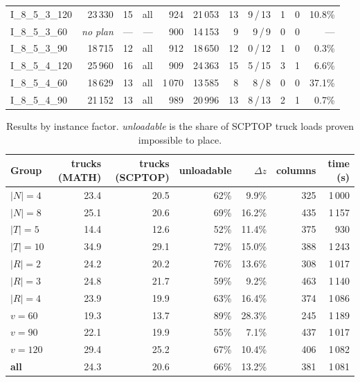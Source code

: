\begin{table}[!htbp]
{\begin{tabular}{lrrrrrrrrrr}
I\_8\_5\_3\_120 & 23\,330 & 15 & all & 924 & 21\,053 & 13 & 9\,/\,13 & 1 & 0 & 10.8\% \\
I\_8\_5\_3\_60 & \emph{no plan} & --- & --- & 900 & 14\,153 & 9 & 9\,/\,9 & 0 & 0 & --- \\
I\_8\_5\_3\_90 & 18\,715 & 12 & all & 912 & 18\,650 & 12 & 0\,/\,12 & 1 & 0 & 0.3\% \\
I\_8\_5\_4\_120 & 25\,960 & 16 & all & 909 & 24\,363 & 15 & 5\,/\,15 & 3 & 1 & 6.6\% \\
I\_8\_5\_4\_60 & 18\,629 & 13 & all & 1\,070 & 13\,585 & 8 & 8\,/\,8 & 0 & 0 & 37.1\% \\
I\_8\_5\_4\_90 & 21\,152 & 13 & all & 989 & 20\,996 & 13 & 8\,/\,13 & 2 & 1 & 0.7\% \\
\bottomrule
\end{tabular}}
\end{table}

\begin{table}[!htbp]
\centering
\small
\caption{Results by instance factor. \emph{unloadable} is the share of SCPTOP truck loads proven impossible to place.}
\label{tab:summary}
\begin{tabular}{lrrrrrr}
\toprule
Group & trucks (MATH) & trucks (SCPTOP) & unloadable & $\Delta z$ & columns & time (s) \\
\midrule
$|N|=4$ & 23.4 & 20.5 & 62\% & 9.9\% & 325 & 1\,000 \\
$|N|=8$ & 25.1 & 20.6 & 69\% & 16.2\% & 435 & 1\,157 \\
$|T|=5$ & 14.4 & 12.6 & 52\% & 11.4\% & 375 & 930 \\
$|T|=10$ & 34.9 & 29.1 & 72\% & 15.0\% & 388 & 1\,243 \\
$|R|=2$ & 24.2 & 20.2 & 76\% & 13.6\% & 308 & 1\,017 \\
$|R|=3$ & 24.8 & 21.7 & 59\% & 9.2\% & 463 & 1\,140 \\
$|R|=4$ & 23.9 & 19.9 & 63\% & 16.4\% & 374 & 1\,086 \\
$v=60$ & 19.3 & 13.7 & 89\% & 28.3\% & 245 & 1\,189 \\
$v=90$ & 22.1 & 19.9 & 55\% & 7.1\% & 437 & 1\,017 \\
$v=120$ & 29.4 & 25.2 & 67\% & 10.4\% & 406 & 1\,082 \\
\textbf{all} & 24.3 & 20.6 & 66\% & 13.2\% & 381 & 1\,081 \\
\bottomrule
\end{tabular}
\end{table}

